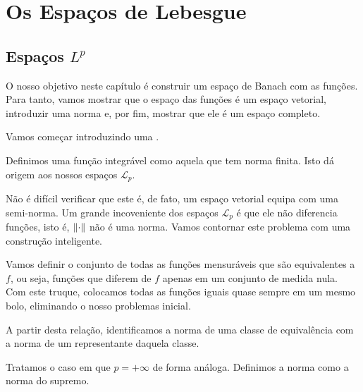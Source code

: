 \chapter{Os Espaços de Lebesgue}












\section{Espaços \texorpdfstring{$L^p$}{Lp}}

O nosso objetivo neste capítulo é construir um espaço de Banach com as funções. Para tanto, vamos mostrar que o espaço das funções é um espaço vetorial, introduzir uma norma e, por fim, mostrar que ele é um espaço completo.

Vamos começar introduzindo uma .

\functionSeminorm

Definimos uma função integrável como aquela que tem norma finita. Isto dá origem aos nossos espaços $\mathcal{L}_p$.

\spaceLpSeminorm

Não é difícil verificar que este é, de fato, um espaço vetorial equipa com uma semi-norma. Um grande incoveniente dos espaços $\mathcal{L}_p$ é que ele não diferencia funções, isto é, $\left\lVert \cdot \right\rVert$ não é uma norma. Vamos contornar este problema com uma construção inteligente.

\equivalenceRelationLp

Vamos definir o conjunto de todas as funções mensuráveis que são equivalentes a $f$, ou seja, funções que diferem de $f$ apenas em um conjunto de medida nula. Com este truque, colocamos todas as funções iguais quase sempre em um mesmo bolo, eliminando o nosso problemas inicial.

\equivalenceClassOfFunction

A partir desta relação, identificamos a norma de uma classe de equivalência com a norma de um representante daquela classe.

\LpSpace

Tratamos o caso em que $p=+\infty$ de forma análoga. Definimos a norma como a norma do supremo.

